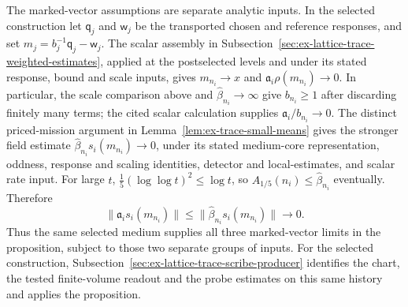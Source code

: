 The marked-vector assumptions are separate analytic inputs. In the selected
construction let $\mathsf q_j$ and $\mathsf w_j$ be the transported chosen and reference
responses, and set $m_j=b_j^{-1}\mathsf q_j-\mathsf w_j$. The scalar assembly in
Subsection~\ref{sec:ex-lattice-trace-weighted-estimates}, applied at the
postselected levels and under its stated response, bound and scale inputs, gives
$m_{n_i}\to x$ and $\mathfrak a_i\rho(m_{n_i})\to0$. In particular, the
scale comparison above and $\widehat\beta_{n_i}\to\infty$ give
$b_{n_i}\ge1$ after discarding finitely many terms; the cited scalar
calculation supplies $\mathfrak a_i/b_{n_i}\to0$.
The distinct priced-mission argument in
Lemma~\ref{lem:ex-trace-small-means} gives the stronger field estimate
$\widehat\beta_{n_i}s_i(m_{n_i})\to0$, under its stated medium-core representation, oddness, response and scaling
identities, detector and local-estimates, and scalar rate input. For large $t$, $\tfrac15(\log\log t)^2\le\log t$,
so $A_{1/5}(n_i)\le\widehat\beta_{n_i}$ eventually. Therefore
\[
 \|\mathfrak a_i s_i(m_{n_i})\|\le
 \|\widehat\beta_{n_i}s_i(m_{n_i})\|\longrightarrow0.
\]
Thus the same selected medium supplies all three marked-vector limits in
the proposition, subject to those two separate groups of inputs. For the selected construction, Subsection~\ref{sec:ex-lattice-trace-scribe-producer}
identifies the chart, the tested finite-volume readout and the probe
estimates on this same history and applies the proposition.
